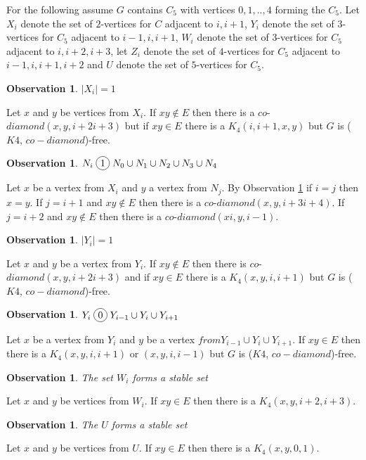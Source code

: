 \documentclass[12pt]{article}
\newcommand*\circled[1]{\tikz[baseline=(char.base)]{
            \node[shape=circle,draw,inner sep=2pt] (char) {#1};}}
\newtheorem{Observation}[Theorem]{Observation}
\def\KCD{($K4$, $co-diamond$)}
\begin{document}
For the following assume $G$ contains $C_5$ with vertices $0, 1, ..,4$ forming the $C_5$. Let $X_i$ denote the set of $2$-vertices for $C$ adjacent to $i, i+1$, $Y_i$ denote the set of $3$-vertices for $C_5$ adjacent to $i-1, i, i+1$, $W_i$ denote the set of $3$-vertices for $C_5$ adjacent to $i, i+2, i+3$, let $Z_i$ denote the set of $4$-vertices for $C_5$ adjacent to $i-1,i,i+1,i+2$  and $U$ denote the set of $5$-vertices for $C_5$.

\begin{Observation}\label{obs:Xi-is-one}
$|X_i| = 1$
\end{Observation}
 Let $x$ and $y$ be vertices from $X_i$. If $xy \not \in E$ then there is a $co$-$diamond (x,y,i+2i+3)$ but if $xy \in E$ there is a $K_4 (i, i+1, x, y)$ but $G$ is {\KCD}-free.

\begin{Observation}\label{obs:Xi-clique}
$N_i \;\circled{1}\; N_0 \cup N_1 \cup N_2 \cup N_3 \cup N_4$
\end{Observation} 
 Let $x$ be a vertex from $X_i$ and $y$ a vertex from $N_j$. By Observation \ref{obs:Xi-is-one} if $i = j$ then $x =y$. If $j = i + 1$ and $xy \not \in E$ then there is a $co$-$diamond (x, y, i+3i+4)$. If $ j =i +2$ and $xy \not \in E$ then there is a $co$-$diamond (xi, y, i-1)$.

\begin{Observation}\label{obs:Yi-is-one}
$|Y_i| = 1$
\end{Observation} 
 Let $x$ and $y$ be a vertex from $Y_i$. If $xy \not \in E$ then there is $co$-$diamond(x,y, i+2i+3)$ and if $xy \in E$ there is a $K_4 (x, y, i, i+1)$ but $G$ is {\KCD}-free.

\begin{Observation}\label{obs:Yi-co-joins}
$Y_i \;\circled{0}\; Y_{i-1} \cup Y_i \cup Y_{i+1}$
\end{Observation}
 Let $x$ be a vertex from $Y_i$ and $y$ be a vertex $from Y_{i-1} \cup Y_i \cup Y_{i+1}$. If $xy \in E$ then there is a $K_4 (x, y, i, i+1)$ or $(x, y, i, i-1)$ but $G$ is {\KCD}-free.

\begin{Observation}\label{obs:Wi-stable}
The set $W_i$ forms a stable set
\end{Observation}
 Let $x$ and $y$ be vertices from $W_i$. If $xy \in E$ then there is a $K_4 (x, y, i+2, i+3)$.

\begin{Observation}\label{obs:U-stable}
The $U$ forms a stable set
\end{Observation}
 Let $x$ and $y$ be vertices from $U$. If $xy \in E$ then there is a $K_4 (x, y, 0, 1)$.
\end{document}
